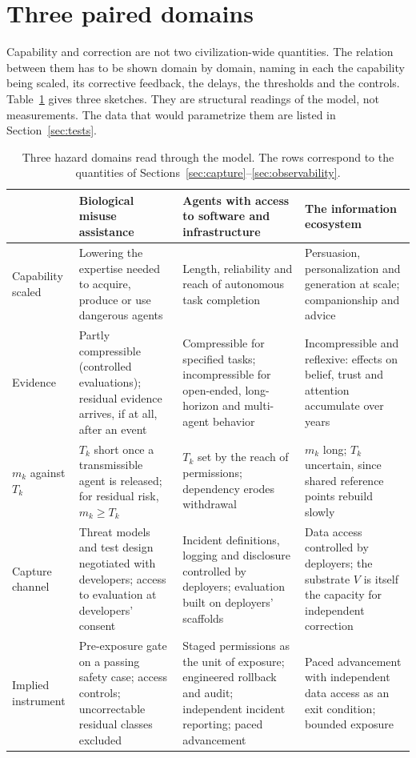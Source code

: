 \documentclass[11pt]{article}
\theoremstyle{plain}
\theoremstyle{definition}
\begin{document}
\section{Three paired domains}\label{sec:domains}

Capability and correction are not two civilization-wide quantities. The relation between them has to be shown domain by domain, naming in each the capability being scaled, its corrective feedback, the delays, the thresholds and the controls. Table~\ref{tab:domains} gives three sketches. They are structural readings of the model, not measurements. The data that would parametrize them are listed in Section~\ref{sec:tests}.

\begin{table}[t]
\centering
\small
\renewcommand{\arraystretch}{1.25}
\begin{tabularx}{\linewidth}{@{}>{\raggedright\arraybackslash}p{2.3cm}>{\raggedright\arraybackslash}X>{\raggedright\arraybackslash}X>{\raggedright\arraybackslash}X@{}}
\toprule
 & Biological misuse assistance & Agents with access to software and infrastructure & The information ecosystem \\
\midrule
Capability scaled & Lowering the expertise needed to acquire, produce or use dangerous agents & Length, reliability and reach of autonomous task completion & Persuasion, personalization and generation at scale; companionship and advice \\
Evidence & Partly compressible (controlled evaluations); residual evidence arrives, if at all, after an event & Compressible for specified tasks; incompressible for open-ended, long-horizon and multi-agent behavior & Incompressible and reflexive: effects on belief, trust and attention accumulate over years \\
$m_k$ against $T_k$ & $T_k$ short once a transmissible agent is released; for residual risk, $m_k\ge T_k$ & $T_k$ set by the reach of permissions; dependency erodes withdrawal & $m_k$ long; $T_k$ uncertain, since shared reference points rebuild slowly \\
Capture channel & Threat models and test design negotiated with developers; access to evaluation at developers' consent & Incident definitions, logging and disclosure controlled by deployers; evaluation built on deployers' scaffolds & Data access controlled by deployers; the substrate $V$ is itself the capacity for independent correction \\
Implied instrument & Pre-exposure gate on a passing safety case; access controls; uncorrectable residual classes excluded & Staged permissions as the unit of exposure; engineered rollback and audit; independent incident reporting; paced advancement & Paced advancement with independent data access as an exit condition; bounded exposure \\
\bottomrule
\end{tabularx}
\caption{Three hazard domains read through the model. The rows correspond to the quantities of Sections~\ref{sec:capture}--\ref{sec:observability}.}
\label{tab:domains}
\end{table}
\end{document}

